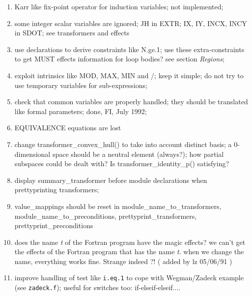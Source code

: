 \begin{enumerate}

  \item Karr like fix-point operator for induction variables; not implemented;

  \item some integer scalar variables are ignored; JH in EXTR;
        IX, IY, INCX, INCY in SDOT; see transformers and effects

  \item use declarations to derive constraints like N.ge.1; use these
        extra-constraints to get MUST effects information for loop bodies?
        see section {\em Regions};

  \item exploit intrinsics like MOD, MAX, MIN and /; keep it simple;
        do not try to use temporary variables for sub-expressions;

  \item check that common variables are properly handled; they should
        be translated like formal parameters; done, FI, July 1992;

  \item EQUIVALENCE equations are lost

  \item change transformer\_convex\_hull() to take into account distinct
        basis; a 0-dimensional space should be a neutral element (always?); how
        partial subspaces could be dealt with? Is transformer\_identity\_p()
        satisfying?

  \item display summary\_transformer before module declarations when
        prettyprinting transformers;

  \item value\_mappings should be reset in module\_name\_to\_transformers,
        module\_name\_to\_preconditions, prettyprint\_transformers,
        prettyprint\_preconditions

  \item does the name {\em t} of the Fortran program have the magic
        effects? we can't get the effects of the Fortran program that
        has the name {\em t}. when we change the name, everything works
        fine. Strange indeed ?! ( added by lz 05/06/91 )

  \item improve handling of test like \verb+i.eq.1+ to cope with Wegman/Zadeck
        example (see \verb+zadeck.f+); 
        useful for switches too: if-elseif-elseif....


\end{enumerate}
